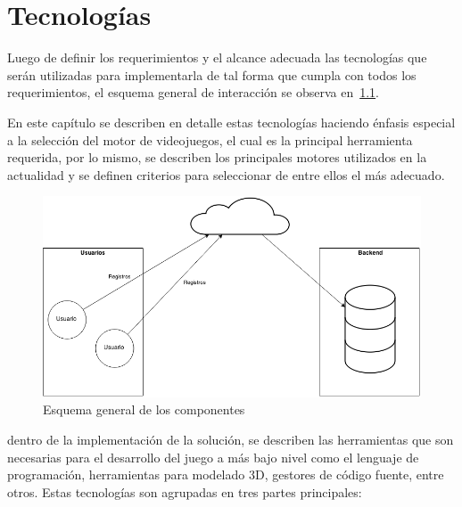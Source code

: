 \chapter{Tecnologías}
\label{chap:tecnologias}

Luego de definir los requerimientos y el alcance   adecuada las tecnologías que serán utilizadas para
implementarla de tal forma que cumpla con todos los requerimientos, el esquema
general de interacción se observa en~\ref{fig:componentes}.

En este capítulo se describen en detalle estas tecnologías haciendo énfasis especial a 
la selección del motor de videojuegos, el cual es la principal herramienta requerida, por 
lo mismo, se describen los principales motores utilizados en la actualidad y se definen 
criterios para seleccionar de entre ellos el más adecuado.


\begin{figure}
\begin{center}
    \includegraphics[scale=0.5]{tecnologias/images/completo.png}
\end{center}
\caption{Esquema general de los componentes}
\label{fig:componentes}
\end{figure}

 dentro de la implementación de la solución, se describen 
las herramientas que son necesarias para el desarrollo del juego a más bajo nivel como el 
lenguaje de programación, herramientas para modelado 3D, gestores de código
fuente, entre otros. Estas tecnologías son agrupadas en tres partes principales:

